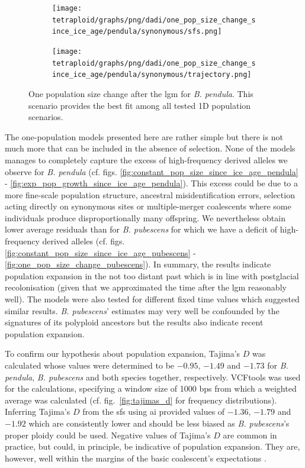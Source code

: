 \documentclass[hidelinks,11pt]{article}
\newcommand{\dadi}{\textdelta a\textdelta i}
\newcommand{\pendula}{\textit{B. pendula}}
\newcommand{\pubescens}{\textit{B. pubescens}}
\begin{document}
    \begin{figure}[H]
        \centering
        \begin{subfigure}[b]{0.465\textwidth}
            \texttt{[image: tetraploid/graphs/png/dadi/one\_pop\_size\_change\_since\_ice\_age/pendula/synonymous/sfs.png]}
        \end{subfigure}
        \hfill
        \begin{subfigure}[b]{0.525\textwidth}
            \texttt{[image: tetraploid/graphs/png/dadi/one\_pop\_size\_change\_since\_ice\_age/pendula/synonymous/trajectory.png]}
        \end{subfigure}
        \caption{One population size change after the \acrshort{lgm} for \pendula{}. This scenario provides the best fit among all tested 1D population scenarios.}
        \label{fig:one_pop_size_change_since_ice_age_pendula}
    \end{figure}

    The one-population models presented here are rather simple but there is not much more that can be included in the absence of selection. None of the models manages to completely capture the excess of high-frequency derived alleles we observe for \pendula{} (cf. figs. \ref{fig:constant_pop_size_since_ice_age_pendula} - \ref{fig:exp_pop_growth_since_ice_age_pendula}). This excess could be due to a more fine-scale population structure, ancestral misidentification errors, selection acting directly on synonymous sites or multiple-merger coalescents where some individuals produce disproportionally many offspring. We nevertheless obtain lower average residuals than for \pubescens{} for which we have a deficit of high-frequency derived alleles (cf. figs. \ref{fig:constant_pop_size_since_ice_age_pubescens} - \ref{fig:one_pop_size_change_pubescens}). In summary, the results indicate population expansion in the not too distant past which is in line with postglacial recolonisation (given that we approximated the time after the \acrshort{lgm} reasonably well). The models were also tested for different fixed time values which suggested similar results. \pubescens{}' estimates may very well be confounded by the signatures of its polyploid ancestors but the results also indicate recent population expansion.

    To confirm our hypothesis about population expansion, Tajima's $D$ was calculated whose values were determined to be $-0.95$, $-1.49$ and $-1.73$ for \pendula{}, \pubescens{} and both species together, respectively. VCFtools was used for the calculations, specifying a window size of 1000 bps from which a weighted average was calculated (cf. fig.~\ref{fig:tajimas_d} for frequency distributions). Inferring Tajima's $D$ from the \acrshort{sfs} using \dadi{} provided values of $-1.36$, $-1.79$ and $-1.92$ which are consistently lower and should be less biased as \pubescens{}'s proper ploidy could be used. Negative values of Tajima's $D$ are common in practice, but could, in principle, be indicative of population expansion. They are, however, well within the margins of the basic coalescent's expectations \cite{hein,gillespie}.
\end{document}
